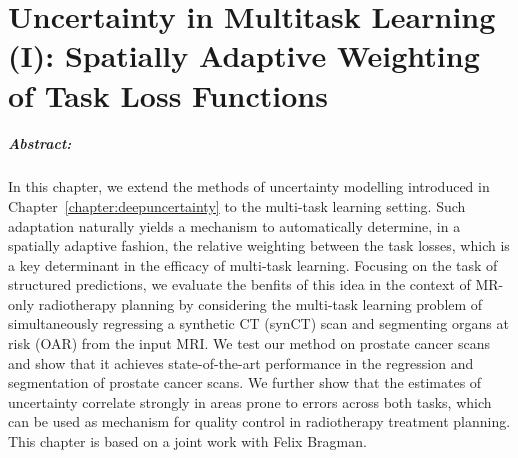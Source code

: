 
\chapter{Uncertainty in Multitask Learning (I): Spatially Adaptive Weighting of Task Loss Functions} \label{chapter:multitaskuncertainty_part1}

\paragraph{Abstract:} In this chapter, we extend the methods of uncertainty modelling introduced in Chapter~\ref{chapter:deepuncertainty} to the multi-task learning setting. Such adaptation naturally yields a mechanism to automatically determine, in a spatially adaptive fashion, the relative weighting between the task losses, which is a key determinant in the efficacy of multi-task learning. Focusing on the task of structured predictions, we evaluate the benfits of this idea in the context of MR-only radiotherapy planning by considering the multi-task learning problem of simultaneously regressing a synthetic CT (synCT) scan and segmenting  organs at risk (OAR) from the input MRI. We test our method on prostate cancer scans and show that it achieves state-of-the-art performance in the regression and segmentation of prostate cancer scans. We further show that the estimates of uncertainty correlate strongly in areas prone to errors across both tasks, which can be used as mechanism for quality control in radiotherapy treatment planning. This chapter is based on a joint work \cite{bragman2018uncertainty} with Felix Bragman.


